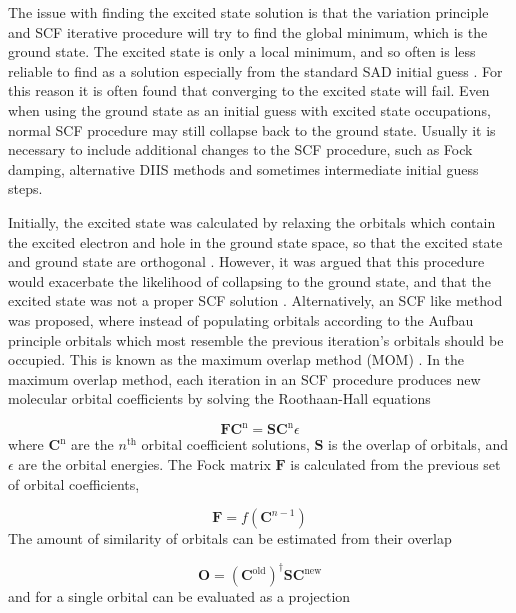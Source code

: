 The issue with finding the excited state solution is that the variation principle
and SCF iterative procedure will try to find the global minimum, which is the 
ground state. The excited state is only a local minimum, and so often is less reliable
to find as a solution especially from the standard SAD initial guess \cite{Almlof1982}. 
For this reason it is often found that converging to the \dscf excited state will
fail. Even when using the ground state as an initial guess with excited state occupations,
normal SCF procedure may still collapse back to the ground state. Usually it is 
necessary to include additional changes to the SCF procedure, such as Fock damping, 
alternative DIIS methods and sometimes intermediate initial guess steps.

Initially, the excited state was calculated by relaxing the orbitals which
contain the excited electron and hole in the ground state space, so that the
excited state and ground state are orthogonal \cite{Hunt1969}. However, it was
argued that this procedure would exacerbate the likelihood of collapsing to the ground
state, and that the excited state was not a proper SCF solution \cite{Gilbert2008}.
Alternatively, an SCF like method was proposed, where instead of populating orbitals 
according to the Aufbau principle orbitals which most resemble the previous iteration's
orbitals should be occupied. This is known as the maximum overlap method (MOM) \cite{Gilbert2008}. 
In the maximum overlap method, each iteration in an SCF procedure produces new molecular
orbital coefficients by solving the Roothaan-Hall equations \cite{Roothaan1951}

\begin{equation}
\mathbf{F} \mathbf{C}^{\text{n}} = \mathbf{S} \mathbf{C}^{\text{n}} \epsilon
\label{eq:roothaan_hall}
\end{equation}
%
where $\mathbf{C}^{\text{n}}$ are the $n^{\text{th}}$ orbital coefficient solutions, 
$\mathbf{S}$ is the overlap of orbitals, and $\epsilon$ are the orbital energies. 
The Fock matrix $\mathbf{F}$ is calculated from the previous set of orbital 
coefficients,

\begin{equation}
\mathbf{F} = f\left(\mathbf{C}^{n-1}\right)
\end{equation}
%
The amount of similarity of orbitals can be estimated from their overlap

\begin{equation}
\mathbf{O} = \left(\mathbf{C}^{\text{old}}\right)^\dagger \mathbf{S} \mathbf{C}^{\text{new}}
\end{equation}
%
and for a single orbital can be evaluated as a projection


